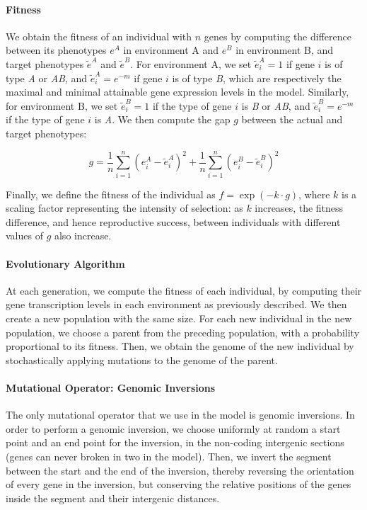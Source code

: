 \paragraph{Fitness}
We obtain the fitness of an individual with $n$ genes by computing the difference between its phenotypes $e^A$ in environment A and $e^B$ in environment B, and target phenotypes $\tilde{e}^A$ and $\tilde{e}^B$.
For environment A, we set $\tilde{e}^A_i = 1$ if gene $i$ is of type \emph{A} or \emph{AB}, and $\tilde{e}^A_i = e^{-m}$ if gene $i$ is of type \emph{B}, which are respectively the maximal and minimal attainable gene expression levels in the model.
Similarly, for environment B, we set $\tilde{e}^B_i = 1$ if the type of gene $i$ is \emph{B} or \emph{AB}, and $\tilde{e}^B_i = e^{-m}$ if the type of gene $i$ is \emph{A}.
We then compute the gap $g$ between the actual and target phenotypes:

\begin{equation}
  g= \frac{1}{n} \sum_{i=1}^{n} (e^A_i - \tilde{e}^A_i)^2 + \frac{1}{n} \sum_{i=1}^{n} (e^B_i - \tilde{e}^B_i)^2
  \label{eq:plos_gap}
\end{equation}

Finally, we define the fitness of the individual as $f = \exp(-k \cdot g)$, where $k$ is a scaling factor representing the intensity of selection: as $k$ increases, the fitness difference, and hence reproductive success, between individuals with different values of $g$ also increase.

\paragraph{Evolutionary Algorithm}
At each generation, we compute the fitness of each individual, by computing their gene transcription levels in each environment as previously described.
We then create a new population with the same size.
For each new individual in the new population, we choose a parent from the preceding population, with a probability proportional to its fitness.
Then, we obtain the genome of the new individual by stochastically applying mutations to the genome of the parent.

\paragraph{Mutational Operator: Genomic Inversions}
The only mutational operator that we use in the model is genomic inversions.
In order to perform a genomic inversion, we choose uniformly at random a start point and an end point for the inversion, in the non-coding intergenic sections (genes can never broken in two in the model).
Then, we invert the segment between the start and the end of the inversion, thereby reversing the orientation of every gene in the inversion, but conserving the relative positions of the genes inside the segment and their intergenic distances.

